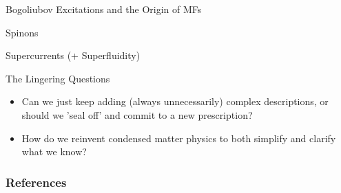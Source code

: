 \documentclass{beamer}
\begin{document}


\begin{frame}{Bogoliubov Excitations and the Origin of MFs}
    
\end{frame}




\begin{frame}{Spinons}
    
\end{frame}




\begin{frame}{Supercurrents (+ Superfluidity)}
    
\end{frame}




\begin{frame}{The Lingering Questions}
    
    \begin{itemize}
        \item Can we just keep adding (always unnecessarily) complex descriptions, or should we 'seal off' and commit to a new prescription?
        
        \item How do we reinvent condensed matter physics to both simplify and clarify what we know?
    \end{itemize}
    
\end{frame}




\begin{frame}[allowframebreaks]
        \frametitle{References}
        \printbibliography
\end{frame}


\end{document}
